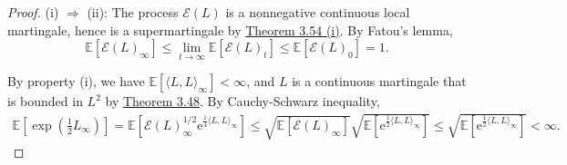 \documentclass{article}
\numberwithin{equation}{section}
\newcommand{\e}{\mathrm{e}}
\newcommand{\E}{\mathbb{E}}
\theoremstyle{plain}
\theoremstyle{definition}
\begin{document}
\begin{proof}
(i) $\Rightarrow$ (ii): The process $\mathscr{E}(L)$ is a nonnegative continuous local martingale, hence is a supermartingale by \hyperref[prop:3.54]{Theorem 3.54 (i)}. By Fatou's lemma, $$\E[\mathscr{E}(L)_\infty]\leq\lim_{t\to\infty}\E[\mathscr{E}(L)_t]\leq\E[\mathscr{E}(L)_0]=1.$$ 

By property (i), we have $\E[\langle L,L\rangle_\infty]<\infty$, and $L$ is a continuous martingale that is bounded in $L^2$ by \hyperref[thm:3.48]{Theorem 3.48}. By Cauchy-Schwarz inequality,
\begin{align*}
	\E\left[\exp\left(\frac{1}{2}L_\infty\right)\right] = \E\left[\mathscr{E}(L)_\infty^{1/2}\e^{\frac{1}{4}\langle L,L\rangle_\infty}\right]\leq\sqrt{\E\left[\mathscr{E}(L)_\infty\right]}\sqrt{\E\left[\e^{\frac{1}{2}\langle L,L\rangle_\infty}\right]}\leq \sqrt{\E\left[\e^{\frac{1}{2}\langle L,L\rangle_\infty}\right]}<\infty.
\end{align*}


\end{proof}
\end{document}
